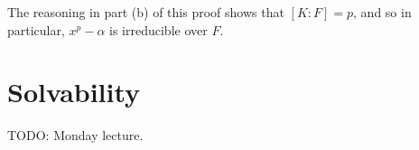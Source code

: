 \begin{remark}
    The reasoning in part (b) of this proof shows that $[K : F] = p$, and so in particular, $x^p - \alpha$ is irreducible over $F$.
\end{remark}

\section{Solvability}

TODO: Monday lecture.
